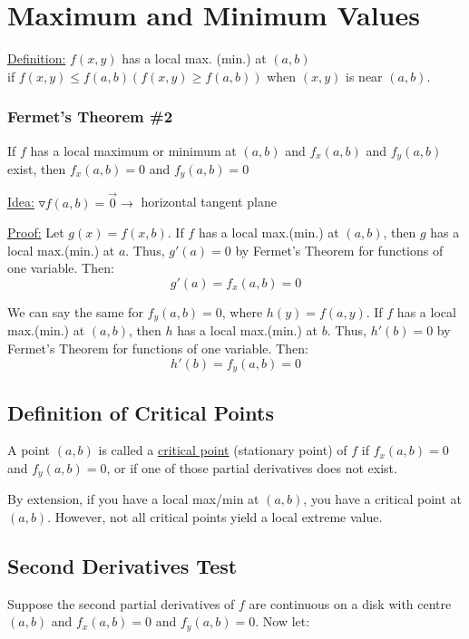 \documentclass[12pt]{article}
\begin{document}
\section{Maximum and Minimum Values}
\underline{Definition:} \(f(x,y)\)  has a local max. (min.) at \((a,b)\)  \\if \(f(x,y) \leq f(a,b) (f(x,y) \geq f(a,b))\) when \((x,y)\) is near \((a,b)\).


\subsubsection{Fermet's Theorem \#2}
If \(f\) has a local maximum or minimum at \((a,b)\) and \(f_x(a,b)\) and \(f_y(a,b)\) exist, then \(f_x(a,b)=0\) and \(f_y(a,b) = 0\) 

\underline{Idea:} \(\triangledown f(a,b) = \vec{0}  \rightarrow \) horizontal tangent plane

\underline{Proof:} Let \(g(x) = f(x,b)\). If \(f\) has a local max.(min.) at \((a,b)\), then \(g\) has a local max.(min.) at \(a\). Thus, \(g'(a) = 0\)  by Fermet's Theorem for functions of one variable. Then:
\[
	g'(a) = f_x(a,b) = 0
\]

We can say the same for \(f_y(a,b) = 0\), where \(h(y) = f(a,y)\). If \(f\) has a local max.(min.) at \((a,b)\), then \(h\) has a local max.(min.) at \(b\). Thus, \(h'(b) = 0\) by Fermet's Theorem for functions of one variable. Then:
\[
	h'(b) = f_y(a,b) = 0
\]

\subsection{Definition of Critical Points}
A point \((a,b)\) is called a \underline{critical point} (stationary point) of \(f\)  if \(f_x(a,b) = 0\) and \(f_y(a,b) = 0\), or if one of those partial derivatives does not exist. 

By extension, if you have a local max/min at \((a,b)\), you have a critical point at \((a,b)\). 
However, not all critical points yield a local extreme value.

\subsection{Second Derivatives Test} 
Suppose the second partial derivatives of \(f\) are continuous on a disk with centre \((a,b)\) and \(f_x(a,b) = 0\) and \(f_y(a,b) = 0\). Now let:
\end{document}
